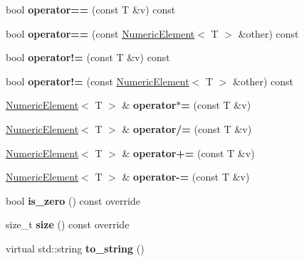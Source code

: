 \begin{DoxyCompactItemize}
\item 
bool {\bfseries operator==} (const T \&v) const \hypertarget{classNumericElement_a577263e095e47157ca3ac82c2b50dda0}{}\label{classNumericElement_a577263e095e47157ca3ac82c2b50dda0}

\item 
bool {\bfseries operator==} (const \hyperlink{classNumericElement}{Numeric\+Element}$<$ T $>$ \&other) const \hypertarget{classNumericElement_afb5166c9e9f26fcb2ffd4fdd4195f574}{}\label{classNumericElement_afb5166c9e9f26fcb2ffd4fdd4195f574}

\item 
bool {\bfseries operator!=} (const T \&v) const \hypertarget{classNumericElement_a5f0452ac2daa4c8385e90a979a496b89}{}\label{classNumericElement_a5f0452ac2daa4c8385e90a979a496b89}

\item 
bool {\bfseries operator!=} (const \hyperlink{classNumericElement}{Numeric\+Element}$<$ T $>$ \&other) const \hypertarget{classNumericElement_a04178c4b76126677e08fba4693ed03fd}{}\label{classNumericElement_a04178c4b76126677e08fba4693ed03fd}

\item 
\hyperlink{classNumericElement}{Numeric\+Element}$<$ T $>$ \& {\bfseries operator$\ast$=} (const T \&v)\hypertarget{classNumericElement_a50997f732c1fa372f55ee56e798d345e}{}\label{classNumericElement_a50997f732c1fa372f55ee56e798d345e}

\item 
\hyperlink{classNumericElement}{Numeric\+Element}$<$ T $>$ \& {\bfseries operator/=} (const T \&v)\hypertarget{classNumericElement_a50f2237512cc3a0d312f1767429ebbec}{}\label{classNumericElement_a50f2237512cc3a0d312f1767429ebbec}

\item 
\hyperlink{classNumericElement}{Numeric\+Element}$<$ T $>$ \& {\bfseries operator+=} (const T \&v)\hypertarget{classNumericElement_a745c05f54d1bdeaac17c7ccdef53a236}{}\label{classNumericElement_a745c05f54d1bdeaac17c7ccdef53a236}

\item 
\hyperlink{classNumericElement}{Numeric\+Element}$<$ T $>$ \& {\bfseries operator-\/=} (const T \&v)\hypertarget{classNumericElement_a04e0b0bc1a09b9dfcd798a02de185cf4}{}\label{classNumericElement_a04e0b0bc1a09b9dfcd798a02de185cf4}

\item 
bool {\bfseries is\+\_\+zero} () const override\hypertarget{classNumericElement_aaf0bcdd27efa2e7ee79be19e1df22e54}{}\label{classNumericElement_aaf0bcdd27efa2e7ee79be19e1df22e54}

\item 
size\+\_\+t {\bfseries size} () const override\hypertarget{classNumericElement_a23ed9009f4d85bea157c1decbd7ae855}{}\label{classNumericElement_a23ed9009f4d85bea157c1decbd7ae855}

\item 
virtual std\+::string {\bfseries to\+\_\+string} ()\hypertarget{classNumericElement_adfd69b45ac7beec0b2850f0864859c35}{}\label{classNumericElement_adfd69b45ac7beec0b2850f0864859c35}

\end{DoxyCompactItemize}
